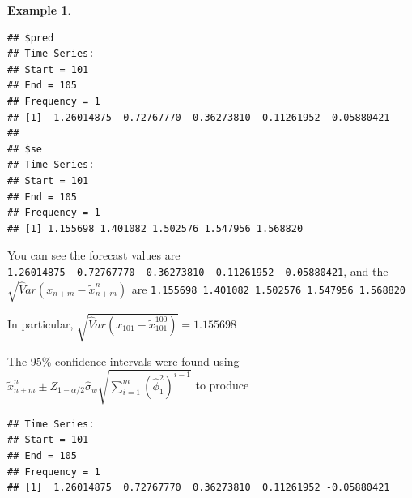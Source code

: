 \documentclass[
]{book}
\newenvironment{Shaded}{\begin{snugshade}}{\end{snugshade}}
\newcommand{\AttributeTok}[1]{\textcolor[rgb]{0.77,0.63,0.00}{#1}}
\newcommand{\CommentTok}[1]{\textcolor[rgb]{0.56,0.35,0.01}{\textit{#1}}}
\newcommand{\DecValTok}[1]{\textcolor[rgb]{0.00,0.00,0.81}{#1}}
\newcommand{\FloatTok}[1]{\textcolor[rgb]{0.00,0.00,0.81}{#1}}
\newcommand{\FunctionTok}[1]{\textcolor[rgb]{0.00,0.00,0.00}{#1}}
\newcommand{\NormalTok}[1]{#1}
\newcommand{\OtherTok}[1]{\textcolor[rgb]{0.56,0.35,0.01}{#1}}
\newcommand{\SpecialCharTok}[1]{\textcolor[rgb]{0.00,0.00,0.00}{#1}}
\theoremstyle{definition}
\theoremstyle{definition}
\newtheorem{example}{Example}[chapter]
\theoremstyle{definition}
\theoremstyle{definition}
\theoremstyle{remark}
\begin{document}
\begin{example}
\begin{verbatim}
## $pred
## Time Series:
## Start = 101 
## End = 105 
## Frequency = 1 
## [1]  1.26014875  0.72767770  0.36273810  0.11261952 -0.05880421
## 
## $se
## Time Series:
## Start = 101 
## End = 105 
## Frequency = 1 
## [1] 1.155698 1.401082 1.502576 1.547956 1.568820
\end{verbatim}

You can see the forecast values are \texttt{1.26014875\ \ 0.72767770\ \ 0.36273810\ \ 0.11261952\ -0.05880421}, and the \(\sqrt{\hat Var(x_{n+m}-\tilde x^n_{n+m})}\) are \texttt{1.155698\ 1.401082\ 1.502576\ 1.547956\ 1.568820}

In particular, \(\sqrt{\hat Var(x_{101}-\tilde x^{100}_{101})}=1.155698\)

The 95\% confidence intervals were found using
\(\tilde x^n_{n+m}\pm Z_{1-\alpha/2} \hat \sigma_w \sqrt{\sum_{i=1}^{m}(\hat \phi_1^2)^{i-1}}\) to produce

\begin{Shaded}
\end{Shaded}

\begin{verbatim}
## Time Series:
## Start = 101 
## End = 105 
## Frequency = 1 
## [1]  1.26014875  0.72767770  0.36273810  0.11261952 -0.05880421
\end{verbatim}

\begin{Shaded}
\end{Shaded}
\end{example}
\end{document}

